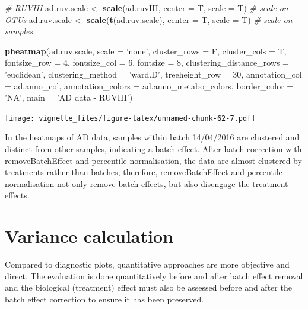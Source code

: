 \documentclass[]{book}
\newenvironment{Shaded}{\begin{snugshade}}{\end{snugshade}}
\newcommand{\KeywordTok}[1]{\textcolor[rgb]{0.13,0.29,0.53}{\textbf{#1}}}
\newcommand{\DataTypeTok}[1]{\textcolor[rgb]{0.13,0.29,0.53}{#1}}
\newcommand{\DecValTok}[1]{\textcolor[rgb]{0.00,0.00,0.81}{#1}}
\newcommand{\StringTok}[1]{\textcolor[rgb]{0.31,0.60,0.02}{#1}}
\newcommand{\CommentTok}[1]{\textcolor[rgb]{0.56,0.35,0.01}{\textit{#1}}}
\newcommand{\NormalTok}[1]{#1}
\begin{document}
\begin{Shaded}
\begin{Highlighting}[]
\CommentTok{# RUVIII}
\NormalTok{ad.ruv.scale <-}\StringTok{ }\KeywordTok{scale}\NormalTok{(ad.ruvIII, }\DataTypeTok{center =}\NormalTok{ T, }\DataTypeTok{scale =}\NormalTok{ T) }\CommentTok{# scale on OTUs}
\NormalTok{ad.ruv.scale <-}\StringTok{ }\KeywordTok{scale}\NormalTok{(}\KeywordTok{t}\NormalTok{(ad.ruv.scale), }\DataTypeTok{center =}\NormalTok{ T, }\DataTypeTok{scale =}\NormalTok{ T) }\CommentTok{# scale on samples}

\KeywordTok{pheatmap}\NormalTok{(ad.ruv.scale, }
         \DataTypeTok{scale =} \StringTok{'none'}\NormalTok{, }
         \DataTypeTok{cluster_rows =}\NormalTok{ F, }
         \DataTypeTok{cluster_cols =}\NormalTok{ T, }
         \DataTypeTok{fontsize_row =} \DecValTok{4}\NormalTok{, }\DataTypeTok{fontsize_col =} \DecValTok{6}\NormalTok{,}
         \DataTypeTok{fontsize =} \DecValTok{8}\NormalTok{,}
         \DataTypeTok{clustering_distance_rows =} \StringTok{'euclidean'}\NormalTok{,}
         \DataTypeTok{clustering_method =} \StringTok{'ward.D'}\NormalTok{,}
         \DataTypeTok{treeheight_row =} \DecValTok{30}\NormalTok{,}
         \DataTypeTok{annotation_col =}\NormalTok{ ad.anno_col,}
         \DataTypeTok{annotation_colors =}\NormalTok{ ad.anno_metabo_colors,}
         \DataTypeTok{border_color =} \StringTok{'NA'}\NormalTok{,}
         \DataTypeTok{main =} \StringTok{'AD data - RUVIII'}\NormalTok{)}
\end{Highlighting}
\end{Shaded}

\texttt{[image: vignette\_files/figure-latex/unnamed-chunk-62-7.pdf]}

In the heatmaps of AD data, samples within batch 14/04/2016 are
clustered and distinct from other samples, indicating a batch effect.
After batch correction with removeBatchEffect and percentile
normalisation, the data are almost clustered by treatments rather than
batches, therefore, removeBatchEffect and percentile normalisation not
only remove batch effects, but also disengage the treatment effects.

\section{Variance calculation}\label{variance-calculation}

Compared to diagnostic plots, quantitative approaches are more objective
and direct. The evaluation is done quantitatively before and after batch
effect removal and the biological (treatment) effect must also be
assessed before and after the batch effect correction to ensure it has
been preserved.
\end{document}
